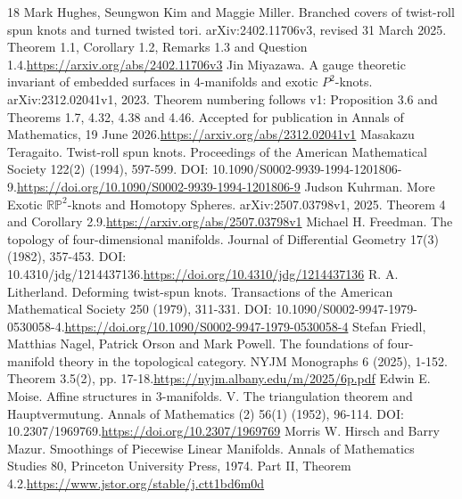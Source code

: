 \documentclass[11pt,letterpaper]{article}
\begin{document}
\begin{thebibliography}{18}
 Mark Hughes, Seungwon Kim and Maggie Miller. Branched covers of twist-roll spun knots and turned twisted tori. arXiv:2402.11706v3, revised 31 March 2025. Theorem 1.1, Corollary 1.2, Remarks 1.3 and Question 1.4.\newline\url{https://arxiv.org/abs/2402.11706v3}
 Jin Miyazawa. A gauge theoretic invariant of embedded surfaces in 4-manifolds and exotic $P^2$-knots. arXiv:2312.02041v1, 2023. Theorem numbering follows v1: Proposition 3.6 and Theorems 1.7, 4.32, 4.38 and 4.46. Accepted for publication in Annals of Mathematics, 19 June 2026.\newline\url{https://arxiv.org/abs/2312.02041v1}
 Masakazu Teragaito. Twist-roll spun knots. Proceedings of the American Mathematical Society 122(2) (1994), 597-599. DOI: 10.1090/S0002-9939-1994-1201806-9.\newline\url{https://doi.org/10.1090/S0002-9939-1994-1201806-9}
 Judson Kuhrman. More Exotic $\mathbb{RP}^2$-knots and Homotopy Spheres. arXiv:2507.03798v1, 2025. Theorem 4 and Corollary 2.9.\newline\url{https://arxiv.org/abs/2507.03798v1}
 Michael H. Freedman. The topology of four-dimensional manifolds. Journal of Differential Geometry 17(3) (1982), 357-453. DOI: 10.4310/jdg/1214437136.\newline\url{https://doi.org/10.4310/jdg/1214437136}
 R. A. Litherland. Deforming twist-spun knots. Transactions of the American Mathematical Society 250 (1979), 311-331. DOI: 10.1090/S0002-9947-1979-0530058-4.\newline\url{https://doi.org/10.1090/S0002-9947-1979-0530058-4}
 Stefan Friedl, Matthias Nagel, Patrick Orson and Mark Powell. The foundations of four-manifold theory in the topological category. NYJM Monographs 6 (2025), 1-152. Theorem 3.5(2), pp. 17-18.\newline\url{https://nyjm.albany.edu/m/2025/6p.pdf}
 Edwin E. Moise. Affine structures in 3-manifolds. V. The triangulation theorem and Hauptvermutung. Annals of Mathematics (2) 56(1) (1952), 96-114. DOI: 10.2307/1969769.\newline\url{https://doi.org/10.2307/1969769}
 Morris W. Hirsch and Barry Mazur. Smoothings of Piecewise Linear Manifolds. Annals of Mathematics Studies 80, Princeton University Press, 1974. Part II, Theorem 4.2.\newline\url{https://www.jstor.org/stable/j.ctt1bd6m0d}

\end{thebibliography}
\end{document}
